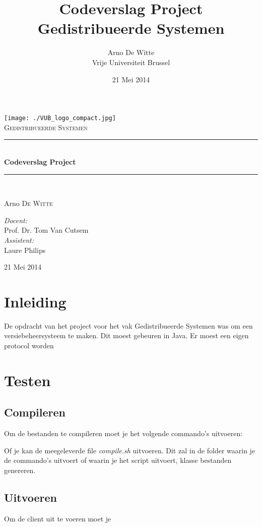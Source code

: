 \documentclass{article}
\title{Codeverslag Project Gedistribueerde Systemen}
\author{Arno De Witte\\
Vrije Universiteit Brussel}
\date{21 Mei 2014}
\newcommand{\HRule}{\rule{\linewidth}{0.5mm}}
\newcommand{\thedate}{21 Mei 2014}
\begin{document}
\begin{titlepage}
\begin{center}

\texttt{[image: ./VUB\_logo\_compact.jpg]}~\\[1cm]


\textsc{\Large Gedistribueerde Systemen}\\[0.5cm]

\HRule \\[0.4cm]
{ \huge \bfseries Codeverslag Project}\\[0.4cm]

\HRule \\[1.5cm]

\begin{minipage}{0.4\textwidth}
\begin{flushleft} \large
Arno \textsc{De Witte}\\
\end{flushleft}
\end{minipage}
\begin{minipage}{0.5\textwidth}
\begin{flushright} \large
\emph{Docent:}\\ Prof. Dr. Tom Van Cutsem\\
\emph{Assistent:}\\ Laure Philips
\end{flushright}
\end{minipage}

\vfill

{\large \thedate}

\end{center}
\end{titlepage}

\newpage
\tableofcontents
\newpage


\section{Inleiding}\label{inleiding}
De opdracht van het project voor het vak Gedistribueerde Systemen was om een versiebeheersysteem te maken. Dit moest gebeuren in Java. Er moest een eigen protocol worden 

\section{Testen}\label{test}
\subsection{Compileren}
Om de bestanden te compileren moet je het volgende commando's uitvoeren:

Of je kan de meegeleverde file \emph{compile.sh} uitvoeren. Dit zal in de folder waarin je de commando's uitvoert of waarin je het script uitvoert, klasse bestanden genereren.
\subsection{Uitvoeren}
Om de client uit te voeren moet je 
\end{document}
